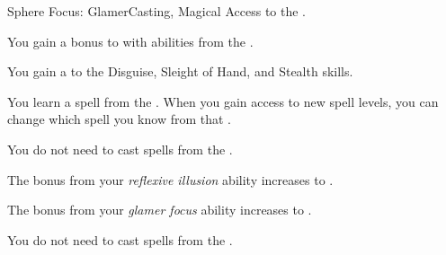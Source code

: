     \begin{feat}{Sphere Focus: Glamer}{Casting, Magical}
        \featpre Access to the  .

         You gain a  bonus to  with abilities from the  .

         You gain a   to the Disguise, Sleight of Hand, and Stealth skills.

         You learn a spell from the  .
        When you gain access to new spell levels, you can change which spell you know from that .

         You do not need  to cast spells from the  .

         The bonus from your \textit{reflexive illusion} ability increases to .

         The bonus from your \textit{glamer focus} ability increases to .

         You do not need  to cast spells from the  .
    \end{feat}


